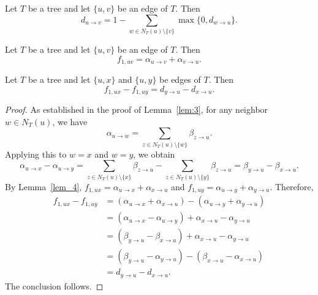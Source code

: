 \documentclass[10pt,a4paper]{amsart}
\begin{document}
\begin{lem} \label{lem:3} 
Let $T$ be a tree and let $\{u,v\}$ be an edge of $T$. Then 
\[
d_{u \to v} = 1 - \sum_{w \in N_T(u) \setminus \{v\}} \max \{ 0, d_{w \to u} \}.
\]
\end{lem}

\begin{lem}\label{lem_4} 
Let $T$ be a tree and let $\{u,v\}$ be an edge of $T$. Then 
\[
f_{1,uv} = \alpha_{u \to v} + \alpha_{v \to u}.
\]
\end{lem}

\begin{lem}\label{lem_7} 
Let $T$ be a tree and let $\{u,x\}$ and $\{u,y\}$ be edges of $T$. Then 
\[
f_{1,ux} - f_{1,uy} = d_{y \to u} - d_{x \to u}.
\]
\end{lem}

\begin{proof} 
As established in the proof of Lemma~\ref{lem:3}, for any neighbor $w \in N_T(u)$, we have
\[
\alpha_{u \to w} = \sum_{z \in N_T(u) \setminus \{w\}} \beta_{z \to u}.
\]
Applying this to $w = x$ and $w = y$, we obtain
\[
\alpha_{u \to x} - \alpha_{u \to y} = \sum_{z \in N_T(u) \setminus \{x\}} \beta_{z \to u} - \sum_{z \in N_T(u) \setminus \{y\}} \beta_{z \to u} = \beta_{y \to u} - \beta_{x \to u}.
\]
By Lemma~\ref{lem_4}, $f_{1,ux} = \alpha_{u \to x} + \alpha_{x \to u}$ and $f_{1,uy} = \alpha_{u \to y} + \alpha_{y \to u}$. Therefore,
\begin{align*}
f_{1,ux} - f_{1,uy} &= (\alpha_{u \to x} + \alpha_{x \to u}) - (\alpha_{u \to y} + \alpha_{y \to u}) \\
&= (\alpha_{u \to x} - \alpha_{u \to y}) + \alpha_{x \to u} - \alpha_{y \to u} \\
&= (\beta_{y \to u} - \beta_{x \to u}) + \alpha_{x \to u} - \alpha_{y \to u} \\
&= (\beta_{y \to u} - \alpha_{y \to u}) - (\beta_{x \to u} - \alpha_{x \to u}) \\
&= d_{y \to u} - d_{x \to u}.
\end{align*}
The conclusion follows.
\end{proof}
\end{document}
